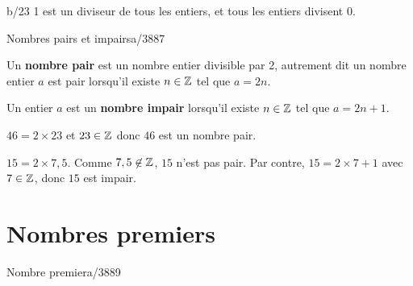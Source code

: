 \begin{pageCours}
\begin{minipage}{0.5\linewidth}
\begin{ExTQ}{}{b/23}
  1 est un diviseur de tous les entiers, et tous les entiers
  divisent 0.
\end{ExTQ}
\end{minipage}


\begin{minipage}{0.5\linewidth}
\begin{DefTQ}{Nombres pairs et impairs}{a/3887}

  Un \textbf{nombre pair} est un nombre entier divisible par 2, autrement
  dit un nombre entier $a$ est pair lorsqu'il existe $n \in \mathbb Z$
  tel que $a=2n$.

  Un entier $a$ est un \textbf{nombre impair} lorsqu'il existe $n \in \mathbb Z$
  tel que $a=2n+1$.
\end{DefTQ}
\end{minipage}
\begin{minipage}{0.5\linewidth}
\begin{Exs} 
$46 = 2 \times 23$ et $23\in\mathbb Z$ donc $46$ est un nombre pair.

  $15= 2 \times 7,5$. Comme $7,5 \not\in\mathbb Z$, $15$ n'est pas pair. Par contre,
  $15=2 \times 7+1$ avec $7 \in \mathbb Z$, donc $15$ est impair.
\end{Exs}
\end{minipage}


%
%


\section{Nombres premiers}

\begin{minipage}{0.5\linewidth}
\begin{DefTQ}{Nombre premier}{a/3889}


\end{DefTQ}
\end{minipage}
\end{pageCours}
